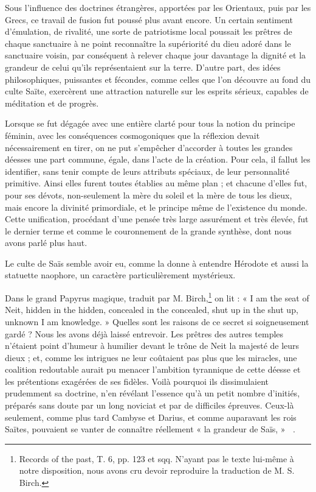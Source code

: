 \documentclass[a4paper, 11pt, oneside]{article}
\newcommand*\hieroAAAW{\raisebox{0.5ex}{}}
\newcommand*\hieroAACW{}
\newcommand*\hieroABAV{}
\begin{document}
Sous l'influence des doctrines étrangères, apportées par les Orientaux, puis par les Grecs, ce travail de fusion fut poussé plus avant encore. Un certain sentiment d'émulation, de rivalité, une sorte de patriotisme local poussait les prêtres de chaque sanctuaire à ne point reconnaître la supériorité du dieu adoré dans le sanctuaire voisin, par conséquent à relever chaque jour davantage la dignité et la grandeur de celui qu'ils représentaient sur la terre. D'autre part, des idées philosophiques, puissantes et fécondes, comme celles que l'on découvre au fond du culte Saïte, exercèrent une attraction naturelle sur les esprits sérieux, capables de méditation et de progrès.

Lorsque se fut dégagée avec une entière clarté pour tous la notion du principe féminin, avec les conséquences cosmogoniques que la réflexion devait nécessairement en tirer, on ne put s'empêcher d'accorder à toutes les grandes déesses une part commune, égale, dans l'acte de la création. Pour cela, il fallut les identifier, sans tenir compte de leurs attributs spéciaux, de leur personnalité primitive. Ainsi elles furent toutes établies au même plan ; et chacune d'elles fut, pour ses dévots, non-seulement la mère du soleil et la mère de tous les dieux, mais encore la divinité primordiale, et le principe même de l'existence du monde. Cette unification, procédant d'une pensée très large assurément et très élevée, fut le dernier terme et comme le couronnement de la grande synthèse, dont nous avons parlé plus haut.

Le culte de Saïs semble avoir eu, comme la donne à entendre Hérodote et aussi la statuette naophore, un caractère particulièrement mystérieux.

Dans le grand Papyrus magique, traduit par M. Birch,\footnote{Records of the past, T. 6, pp. 123 et sqq. N'ayant pas le texte lui-même à notre disposition, nous avons cru devoir reproduire la traduction de M. S. Birch.} on lit : « I am the seat of Neit, hidden in the hidden, concealed in the concealed, shut up in the shut up, unknown I am knowledge. » Quelles sont les raisons de ce secret si soigneusement gardé ? Nous les avons déjà laissé entrevoir. Les prêtres des autres temples n'étaient point d'humeur à humilier devant le trône de Neit la majesté de leurs dieux ; et, comme les intrigues ne leur coûtaient pas plus que les miracles, une coalition redoutable aurait pu menacer l'ambition tyrannique de cette déesse et les prétentions exagérées de ses fidèles. Voilà pourquoi ils dissimulaient prudemment sa doctrine, n'en révélant l'essence qu'à un petit nombre d'initiés, préparés sans doute par un long noviciat et par de difficiles épreuves. Ceux-là seulement, comme plus tard Cambyse et Darius, et comme auparavant les rois Saïtes, pouvaient se vanter de connaître réellement « la grandeur de Saïs, » $\hieroABAV\:\hieroAACW\:\hieroAAAW$.
\end{document}
